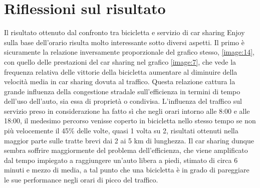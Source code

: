 \section{Riflessioni sul risultato}



Il risultato ottenuto dal confronto tra bicicletta e servizio di car sharing Enjoy sulla base dell'orario risulta molto interessante sotto diversi aspetti. Il primo è sicuramente la relazione inversamente proporzionale del grafico stesso, \ref{image:14}, con quello delle prestazioni del car sharing nel grafico \ref{image:7}, che vede la frequenza relativa delle vittorie della bicicletta aumentare al diminuire della velocità media in car sharing dovuta al traffico. Questa relazione cattura la grande influenza della congestione stradale sull'efficienza in termini di tempo dell'uso dell'auto, sia essa di proprietà o condivisa. L'influenza del traffico sul servizio preso in considerazione ha fatto sì che negli orari intorno alle 8:00 e alle 18:00, il medesimo percorso venisse coperto in bicicletta nello stesso tempo se non più velocemente il 45\% delle volte, quasi 1 volta su 2, risultati ottenuti nella maggior parte sulle tratte brevi dai 2 ai 5 km di lunghezza. Il car sharing dunque sembra soffrire maggiormente del problema dell'efficienza, che viene amplificato dal tempo impiegato a raggiungere un'auto libera a piedi, stimato di circa 6 minuti e mezzo di media, a tal punto che una bicicletta è in grado di pareggiare le sue performance negli orari di picco del traffico.

